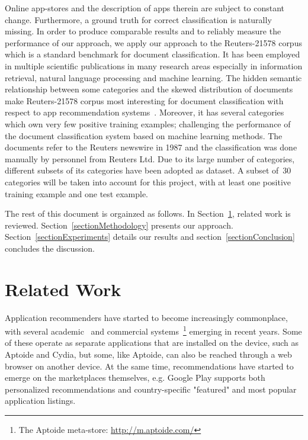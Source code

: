 \documentclass{sigchi}
\begin{document}
Online app-stores and the description of apps therein are subject to constant change. 
Furthermore, a ground truth for correct classification is naturally missing. 
In order to produce comparable results and to reliably measure the performance of our approach, we apply our approach to the Reuters-21578 corpus which is a standard benchmark for document classification. 
It has been employed in multiple scientific publications in many research areas especially in information retrieval, natural language
processing and machine learning. 
The hidden semantic relationship between some categories and the skewed distribution of documents make Reuters-21578 corpus most
interesting for document classification with respect to app recommendation systems~\cite{debole2005analysis}. 
Moreover, it has several categories which own very few positive training examples; challenging the performance of the document classification system based on machine learning methods.
The documents refer to the Reuters newswire in 1987 and the classification was done manually by personnel from Reuters Ltd. 
Due to its large number of categories, different subsets of its categories have been adopted as dataset. 
A subset of~30 categories will be taken into account for this project, with at least one positive training example and one test example.

The rest of this document is orgainzed as follows. 
In Section~\ref{sectionRelatedWork}, related work is reviewed. 
Section~\ref{sectionMethodology} presents our approach.
Section~\ref{sectionExperiments} details our results and section~\ref{sectionConclusion} concludes the discussion.

\section{Related Work}\label{sectionRelatedWork}
Application recommenders have started to become increasingly commonplace, with several academic~\cite{Yan-mobisys-2011,Shi-sigkdd-2012} and commercial systems~\footnote{The Aptoide meta-store: \url{http://m.aptoide.com/}} %
emerging in recent years. 
Some of these operate as separate applications that are installed on the device, such as Aptoide and Cydia, but some, like Aptoide, can also be reached through a web browser on another device.
At the same time, recommendations have started to emerge on the marketplaces themselves, e.g. Google Play supports both personalized recommendations and country-specific "featured" and most popular application listings.
\end{document}

